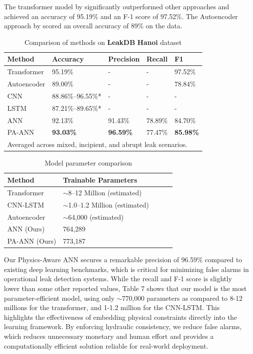 \documentclass[final,5p,times,twocolumn,authoryear]{elsarticle}
\begin{document}
The transformer model by \cite{s24196294} significantly outperformed other approaches and achieved an accuracy of 95.19\% and an F-1 score of 97.52\%. The Autoencoder approach by \cite{10095760} scored an overall accuracy of 89\% on the data.

\begin{table}[!htbp]
\centering
\caption{Comparison of methods on \textbf{LeakDB} \textbf{Hanoi} dataset}
\label{tab:benchmark_comparison}
\begin{tabular}{@{}lllll@{}}
\toprule
\textbf{Method} & \textbf{Accuracy} & \textbf{Precision} & \textbf{Recall} & \textbf{F1} \\
\midrule
Transformer & 95.19\% & - & - & 97.52\% \\ 
Autoencoder & 89.00\% & - & - & 78.84\% \\
CNN & 88.86\%--96.55\%* & - & - & - \\
LSTM & 87.21\%--89.65\%* & - & - & - \\
ANN & 92.13\% & 91.43\% & 78.89\% & 84.70\% \\
PA-ANN & \textbf{93.03\%} & \textbf{96.59\%} & 77.47\% & \textbf{85.98\%} \\
\bottomrule
\multicolumn{5}{l}{\footnotesize *Averaged across mixed, incipient, and abrupt leak scenarios.}
\end{tabular}
\end{table}

\begin{table}[!htbp]
\centering
\caption{Model parameter comparison}
\label{tab:parameter_comparison}
\begin{tabular}{@{}lllll@{}}
\toprule
\textbf{Method} & \textbf{Trainable Parameters} \\
\midrule
Transformer & $\sim$8--12 Million (estimated) \\
CNN-LSTM & $\sim$1.0--1.2 Million (estimated) \\
Autoencoder & $\sim$64,000 (estimated) \\
ANN (Ours) & 764,289 \\
PA-ANN (Ours) & 773,187 \\
\bottomrule
\end{tabular}
\end{table}

Our Physics-Aware ANN secures a remarkable precision of 96.59\% compared to existing deep learning benchmarks, which is critical for minimizing false alarms in operational leak detection systems. While the recall and F-1 score is slightly lower than some other reported values, Table 7 shows that our model is the most parameter-efficient model, using only $\sim$770,000 parameters as compared to 8-12 millions for the transformer, and 1-1.2 million for the CNN-LSTM.
This highlights the effectiveness of embedding physical constraints directly into the learning framework. By enforcing hydraulic consistency, we reduce false alarms, which reduces unnecessary monetary and human effort and provides a computationally efficient solution reliable for real-world deployment.   
\end{document}
